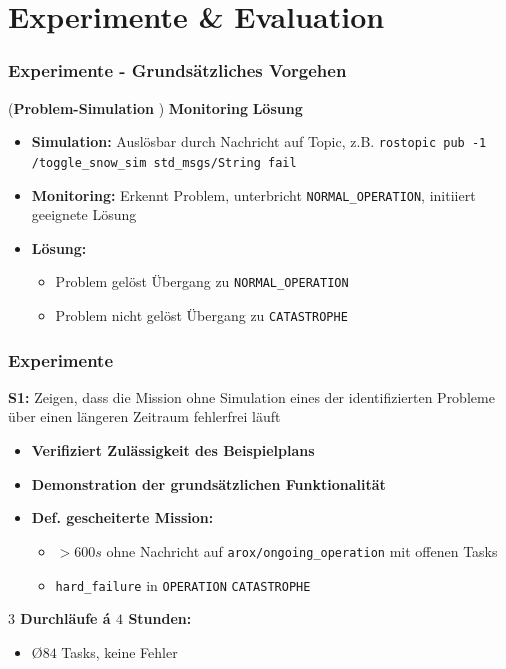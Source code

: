 \documentclass{beamer}
\newcommand{\code}[1]{\colorbox{light-gray}{\texttt{#1}}}
\begin{document}
\section{Experimente \& Evaluation}

\begin{frame}
  \frametitle{Experimente - Grundsätzliches Vorgehen}
  (\textbf{Problem-Simulation} \textrightarrow) \thinspace \textbf{Monitoring} \textrightarrow \thinspace \textbf{Lösung}
  \begin{itemize}
    \item \textbf{Simulation:} Auslösbar durch Nachricht auf Topic, z.B. \code{rostopic pub -1 /toggle\_snow\_sim std\_msgs/String fail}
    \item \textbf{Monitoring:} Erkennt Problem, unterbricht \code{NORMAL\_OPERATION}, initiiert geeignete Lösung
    \item \textbf{Lösung:}
    \begin{itemize}
      \item Problem gelöst \textrightarrow \thinspace Übergang zu \code{NORMAL\_OPERATION}
      \item Problem nicht gelöst \textrightarrow \thinspace Übergang zu \code{CATASTROPHE}
    \end{itemize}
  \end{itemize}
\end{frame}

\begin{frame}
  \frametitle{Experimente}
  \textbf{S1:} Zeigen, dass die Mission ohne Simulation eines der identifizierten Probleme über einen längeren Zeitraum fehlerfrei läuft
  \begin{itemize}
    \item \textbf{Verifiziert Zulässigkeit des Beispielplans}
    \item \textbf{Demonstration der grundsätzlichen Funktionalität}
    \item \textbf{Def. gescheiterte Mission:}
    \begin{itemize}
      \item $> 600s$ ohne Nachricht auf \code{arox/ongoing\_operation} mit offenen Tasks
      \item \code{hard\_failure} in \code{OPERATION} \textrightarrow \thinspace \code{CATASTROPHE}
    \end{itemize}
  \end{itemize}
  \textbf{$3$ Durchläufe á $4$ Stunden:}
  \begin{itemize}
    \item \O $84$ Tasks, keine Fehler
  \end{itemize}
\end{frame}
\end{document}
